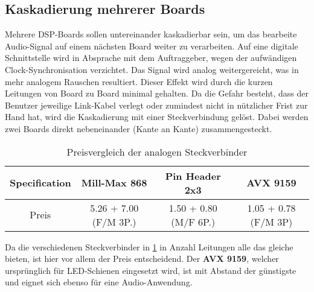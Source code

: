 \subsection{Kaskadierung mehrerer Boards}
\label{subsec:Konzept_Kaskadierung}

Mehrere DSP-Boards sollen untereinander kaskadierbar sein, um das bearbeite Audio-Signal auf einem nächsten Board weiter zu verarbeiten. Auf eine digitale Schnittstelle wird in Absprache mit dem Auftraggeber, wegen der aufwändigen Clock-Synchronisation verzichtet. Das Signal wird analog weitergereicht, was in mehr analogem Rauschen resultiert. Dieser Effekt wird durch die kurzen Leitungen von Board zu Board minimal gehalten. Da die Gefahr besteht, dass der Benutzer jeweilige Link-Kabel verlegt oder zumindest nicht in nützlicher Frist zur Hand hat, wird die Kaskadierung mit einer Steckverbindung gelöst. Dabei werden zwei Boards direkt nebeneinander (Kante an Kante) zusammengesteckt.


\begin{table}[H]
	\centering
	\begin{tabular}{|c|c|c|c|}
		\hline
		\textbf{Specification} & \textbf{Mill-Max 868}             & \textbf{Pin Header 2x3} & \textbf{AVX 9159} \\ \hline
		Preis         & 5.26 + 7.00 (F/M 3P.)& 1.50 + 0.80 (M/F 6P.)&1.05 + 0.78 (F/M 3P)         \\ \hline
	\end{tabular}
	\caption{Preisvergleich der analogen Steckverbinder}
	\label{tab:stecker}
\end{table}

Da die verschiedenen Steckverbinder in \ref{tab:stecker} in Anzahl Leitungen alle das gleiche bieten, ist hier vor allem der Preis entscheidend. Der \textbf{AVX 9159}, welcher ursprünglich für LED-Schienen eingesetzt wird, ist mit Abstand der günstigste und eignet sich ebenso für eine Audio-Anwendung.



%
